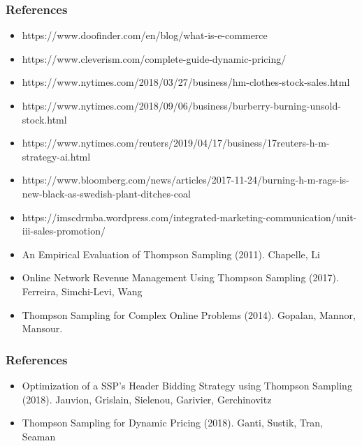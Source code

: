 \documentclass[11pt]{beamer}
\begin{document}
\begin{frame}
\frametitle{References}
\begin{itemize}
\item https://www.doofinder.com/en/blog/what-is-e-commerce
\item https://www.cleverism.com/complete-guide-dynamic-pricing/
\item https://www.nytimes.com/2018/03/27/business/hm-clothes-stock-sales.html
\item https://www.nytimes.com/2018/09/06/business/burberry-burning-unsold-stock.html
\item https://www.nytimes.com/reuters/2019/04/17/business/17reuters-h-m-strategy-ai.html
\item https://www.bloomberg.com/news/articles/2017-11-24/burning-h-m-rags-is-new-black-as-swedish-plant-ditches-coal
\item https://imscdrmba.wordpress.com/integrated-marketing-communication/unit-iii-sales-promotion/
\item An Empirical Evaluation of Thompson Sampling (2011). Chapelle, Li
\item Online Network Revenue Management Using Thompson Sampling (2017). Ferreira, Simchi-Levi, Wang 
\item Thompson Sampling for Complex Online Problems (2014). Gopalan, Mannor, Mansour.
\end{itemize}
\end{frame}

\begin{frame}
\frametitle{References}
\begin{itemize}
\item Optimization of a SSP’s Header Bidding Strategy using Thompson Sampling (2018). Jauvion, Grislain, Sielenou, Garivier, Gerchinovitz
\item Thompson Sampling for Dynamic Pricing (2018). Ganti, Sustik, Tran, Seaman
\end{itemize}
\end{frame}
\end{document}
